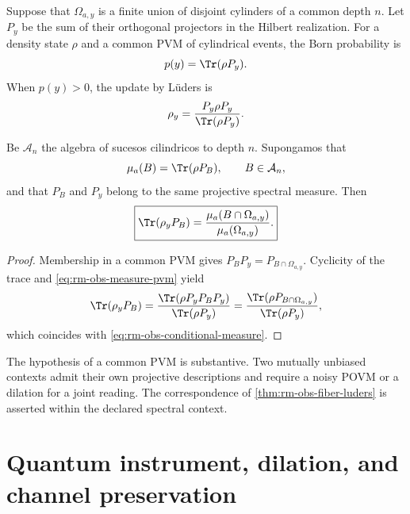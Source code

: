 Suppose that \(\Omega_{a,y}\) is a finite union of disjoint cylinders
of a common depth \(n\). Let \(P_y\) be the sum of their
orthogonal projectors in the Hilbert realization. For a density
state \(\rho\) and a common PVM of cylindrical events, the Born probability
is
\begin{equation}
 p(y)=\Tr(\rho P_y).
 \label{eq:rm-obs-born}
\end{equation}
When \(p(y)>0\), the update by Lüders \cite{Luders1951} is
\begin{equation}
 \rho_y=\frac{P_y\rho P_y}{\Tr(\rho P_y)}.
 \label{eq:rm-obs-luders}
\end{equation}

\begin{theorem}
\label{thm:rm-obs-fiber-luders}
Be \(\mathcal A_n\) the algebra of sucesos cilindricos to depth
\(n\). Supongamos that
\begin{equation}
 \mu_a(B)=\Tr(\rho P_B),
 \qquad B\in\mathcal A_n,
 \label{eq:rm-obs-measure-pvm}
\end{equation}
and that \(P_B\) and \(P_y\) belong to the same projective spectral measure.
Then
\begin{equation}
 \boxed{
 \Tr(\rho_yP_B)
 =\frac{\mu_a(B\cap\Omega_{a,y})}
 {\mu_a(\Omega_{a,y})}.}
 \label{eq:rm-obs-luders-fiber-equivalence}
\end{equation}
\end{theorem}

\begin{proof}
Membership in a common PVM gives
\(P_BP_y=P_{B\cap\Omega_{a,y}}\). Cyclicity of the trace and
\cref{eq:rm-obs-measure-pvm} yield
\[
 \Tr(\rho_yP_B)
 =\frac{\Tr(\rho P_yP_BP_y)}{\Tr(\rho P_y)}
 =\frac{\Tr(\rho P_{B\cap\Omega_{a,y}})}
 {\Tr(\rho P_y)},
\]
which coincides with \cref{eq:rm-obs-conditional-measure}.
\end{proof}

The hypothesis of a common PVM is substantive. Two mutually
unbiased contexts admit their own projective descriptions and require a noisy POVM
or a dilation for a joint reading. The correspondence of
\cref{thm:rm-obs-fiber-luders} is asserted within the declared spectral
context.

\section{Quantum instrument, dilation, and channel preservation}

